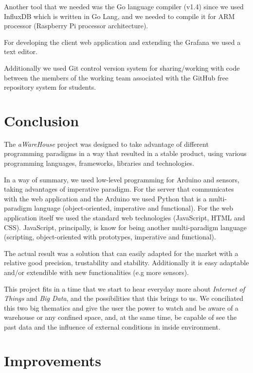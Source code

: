 \documentclass[12pt]{report}
\begin{document}
Another tool that we needed was the Go language compiler (v1.4) since we used InfluxDB which is written in Go Lang\cite{goinflux}, and we needed to compile it for ARM processor (Raspberry Pi processor architecture).

For developing the client web application and extending the Grafana we used a text editor.

Additionally we used Git control version system for sharing/working with code between the members of the working team associated with the GitHub free repository system for students.

\newpage
\chapter{Conclusion}

The \textit{aWareHouse} project was designed to take advantage of different programming paradigms in a way that resulted in a stable product, using various programming languages, frameworks, libraries and technologies. 

In a way of summary, we used low-level programming for Arduino and sensors, taking advantages of imperative paradigm. For the server that communicates with the web application and the Arduino we used Python that is a multi-paradigm language (object-oriented, imperative and functional). For the web application itself we used the standard web technologies (JavaScript, HTML and CSS). JavaScript, principally, is know for being another multi-paradigm language (scripting, object-oriented with prototypes, imperative and functional).

The actual result was a solution that can easily adapted for the market with a relative good precision, trustability and stability. Additionally it is easy adaptable and/or extendible with new functionalities (e.g more sensors).

This project fits in a time that we start to hear everyday more about \textit{Internet of Things} and \textit{Big Data}, and the possibilities that this brings to us. We conciliated this two big thematics and give the user the power to watch and be aware of a warehouse or any confined space, and, at the same time, be capable of see the past data and the influence of external conditions in inside environment.

\newpage
\chapter{Improvements}
\end{document}
